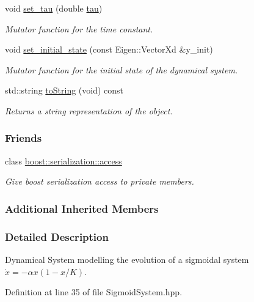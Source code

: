\begin{DoxyCompactItemize}
void \hyperlink{classDmpBbo_1_1SigmoidSystem_a17edb45ef62a4ef7f8c78e4f8f68b249}{set\+\_\+tau} (double \hyperlink{group__DynamicalSystems_ga50eec7ad4c9664b5809ace45b22200d5}{tau})
\begin{DoxyCompactList}\small\item\em Mutator function for the time constant. \end{DoxyCompactList}\item 
void \hyperlink{classDmpBbo_1_1SigmoidSystem_ad4e11c676c2add8a992db1caf542f0a0}{set\+\_\+initial\+\_\+state} (const Eigen\+::\+Vector\+Xd \&y\+\_\+init)
\begin{DoxyCompactList}\small\item\em Mutator function for the initial state of the dynamical system. \end{DoxyCompactList}\item 
std\+::string \hyperlink{classDmpBbo_1_1SigmoidSystem_a1aca816b42cf0d36118be0ab91120d77}{to\+String} (void) const 
\begin{DoxyCompactList}\small\item\em Returns a string representation of the object. \end{DoxyCompactList}\end{DoxyCompactItemize}
\subsubsection*{Friends}
\begin{DoxyCompactItemize}
\item 
class \hyperlink{classDmpBbo_1_1SigmoidSystem_ac98d07dd8f7b70e16ccb9a01abf56b9c}{boost\+::serialization\+::access}
\begin{DoxyCompactList}\small\item\em Give boost serialization access to private members. \end{DoxyCompactList}\end{DoxyCompactItemize}
\subsubsection*{Additional Inherited Members}


\subsubsection{Detailed Description}
Dynamical System modelling the evolution of a sigmoidal system $\dot{x} = -\alpha x(1-x/K)$. 

Definition at line 35 of file Sigmoid\+System.\+hpp.



